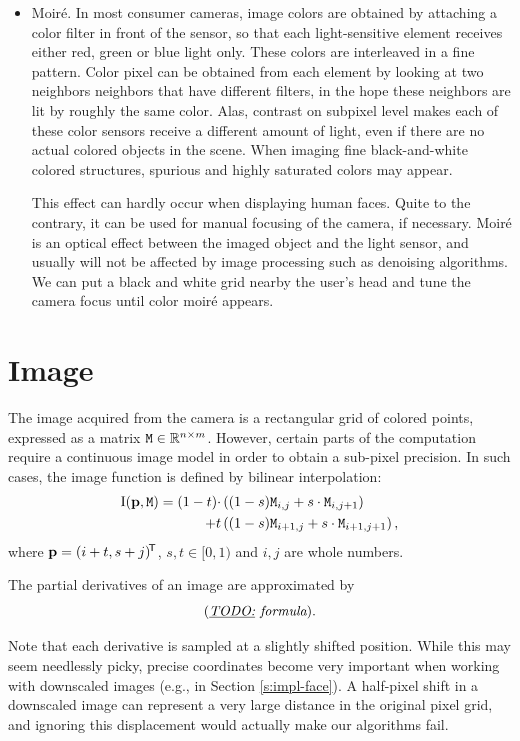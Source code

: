 \begin{itemize}
\item
Moiré.
In most consumer cameras, image colors are obtained by attaching a color filter in front of the sensor, so that each light-sensitive element receives either red, green or blue light only.
These colors are interleaved in a fine pattern.
Color pixel can be obtained from each element by looking at two neighbors neighbors that have different filters, in the hope these neighbors are lit by roughly the same color.
Alas, contrast on subpixel level makes each of these color sensors receive a different amount of light, even if there are no actual colored objects in the scene.
When imaging fine black-and-white colored structures, spurious and highly saturated colors may appear.

This effect can hardly occur when displaying human faces.
Quite to the contrary, it can be used for manual focusing of the camera, if necessary.
Moiré is an optical effect between the imaged object and the light sensor, and usually will not be affected by image processing such as denoising algorithms.
We can put a black and white grid nearby the user's head and tune the camera focus until color moiré appears.

\end{itemize}

\section{Image}
\label{s.imagemodel}

The image acquired from the camera is a rectangular grid of colored points, expressed as a matrix $\mathtt{M} \in \mathbb{R}^{n\times m}$.
However, certain parts of the computation require a continuous image model in order to obtain a sub-pixel precision.
In such cases, the image function is defined by bilinear interpolation:
\begin{align}
\mathrm{I}(\mathbf{p}, \mathtt{M}) = (1 - t) \cdot&\left((1 - s) \mathtt{M}_{i, j} + s \cdot \mathtt{M}_{i, j+1} \right) \\
+ t&\left((1 - s) \mathtt{M}_{i+1, j} + s \cdot \mathtt{M}_{i+1, j+1} \right), \notag
\end{align}
where $\mathbf{p} = (i + t, s + j)^{\!\mathsf{T}}$, $s, t \in \lbrack0, 1)$ and $i, j$ are whole numbers.

The partial derivatives of an image are approximated by 
$$(\textit{\underline{TODO:} formula}).$$

Note that each derivative is sampled at a slightly shifted position.
While this may seem needlessly picky, precise coordinates become very important when working with downscaled images (e.g., in Section \ref{s:impl-face}).
A half-pixel shift in a downscaled image can represent a very large distance in the original pixel grid, and ignoring this displacement would actually make our algorithms fail.

